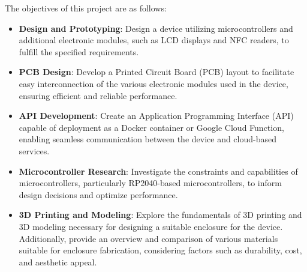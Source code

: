 The objectives of this project are as follows:
\begin{itemize}
    \item \textbf{Design and Prototyping}: Design a device utilizing microcontrollers and additional electronic 
    modules, such as LCD displays and NFC readers, to fulfill the specified requirements.
    \item \textbf{PCB Design}: Develop a Printed Circuit Board (PCB) layout to facilitate easy interconnection of 
    the various electronic modules used in the device, ensuring efficient and reliable performance.
    \item \textbf{API Development}: Create an Application Programming Interface (API) capable of deployment as a 
    Docker container or Google Cloud Function, enabling seamless communication between the device and cloud-based services.
    \item \textbf{Microcontroller Research}: Investigate the constraints and capabilities of microcontrollers, particularly 
    RP2040-based microcontrollers, to inform design decisions and optimize performance.
    \item \textbf{3D Printing and Modeling}: Explore the fundamentals of 3D printing and 3D modeling necessary for 
    designing a suitable enclosure for the device. Additionally, provide an overview and comparison of various materials 
    suitable for enclosure fabrication, considering factors such as durability, cost, and aesthetic appeal.
\end{itemize}
